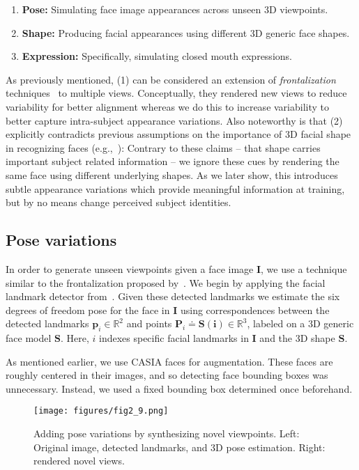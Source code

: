 \documentclass[runningheads]{llncs}
\def\mbf#1{\mathbf{#1}}
\begin{document}
\begin{enumerate}
\item {\bf Pose:} Simulating face image appearances across unseen 3D viewpoints.
\item {\bf Shape:} Producing facial appearances using different 3D generic face shapes.
\item {\bf Expression:} Specifically, simulating closed mouth expressions.
\end{enumerate}
As previously mentioned, (1) can be considered an extension of {\em frontalization} techniques~\cite{hassner2015effective} to multiple views. Conceptually, they rendered new views to reduce variability for better alignment whereas we do this to increase variability to better capture intra-subject appearance variations. Also noteworthy is that (2) explicitly contradicts previous assumptions on the importance of 3D facial shape in recognizing faces (e.g.,~\cite{taigman2014deepface}): Contrary to these claims -- that shape carries important subject related information -- we ignore these cues by rendering the same face using different underlying shapes. As we later show, this introduces subtle appearance variations which provide meaningful information at training, but by no means change perceived subject identities.

\subsection{Pose variations}\label{sec:pose}
In order to generate unseen viewpoints given a face image $\mbf{I}$, we use a technique similar to the frontalization proposed by~\cite{hassner2015effective}. We begin by applying the facial landmark detector from~\cite{lp:landmark}. Given these detected landmarks we estimate the six degrees of freedom pose for the face in $\mbf{I}$ using correspondences between the detected landmarks $\mbf{p}_i \in \mathbb{R}^{2}$ and points $\mbf{P}_i \doteq \mbf{S(i)} \in \mathbb{R}^{3}$, labeled on a 3D generic face model $\mbf{S}$. Here, $i$ indexes specific facial landmarks in $\mbf{I}$ and the 3D shape $\mbf{S}$. 

As mentioned earlier, we use CASIA faces for augmentation. These faces are roughly centered in their images, and so detecting face bounding boxes was unnecessary. Instead, we used a fixed bounding box determined once beforehand.


\begin{figure}[t]
\centering
\texttt{[image: figures/fig2\_9.png]}
\caption{Adding pose variations by synthesizing novel viewpoints. Left: Original image, detected landmarks, and 3D pose estimation. Right: rendered novel views.}
\label{fig:poses}
\vspace{-3mm}
\end{figure}
\end{document}
